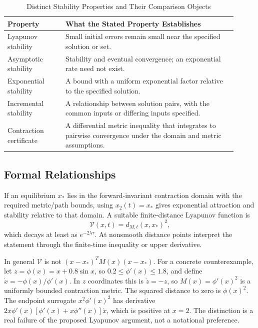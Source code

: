 \begin{table}[htbp]
\centering\small
\begin{tabular}{@{}p{0.23\linewidth}p{0.68\linewidth}@{}}
\toprule
Property & What the Stated Property Establishes\\
\midrule
Lyapunov stability & Small initial errors remain small near the specified solution or set.\\
Asymptotic stability & Stability and eventual convergence; an exponential rate need not exist.\\
Exponential stability & A bound with a uniform exponential factor relative to the specified solution.\\
Incremental stability & A relationship between solution pairs, with the common inputs or differing inputs specified.\\
Contraction certificate & A differential metric inequality that integrates to pairwise convergence under the domain and metric assumptions.\\
\bottomrule
\end{tabular}
\caption{Distinct Stability Properties and Their Comparison Objects}
\label{tbl:ch4:lyapunov-contraction}
\end{table}

\subsection{Formal Relationships}

\begin{proposition}
\label{prop:ch4:contraction-lyapunov}
If an equilibrium $x_*$ lies in the forward-invariant contraction domain with the required metric/path bounds, using $x_2(t)=x_*$ gives exponential attraction and stability relative to that domain. A suitable finite-distance Lyapunov function is
\begin{equation}
\mathcal V(x,t)=d_{M,t}(x,x_*)^2,
\label{eq:ch4:induced-lyapunov}
\end{equation}
which decays at least as $e^{-2\lambda\tau}$. At nonsmooth distance points interpret the statement through the finite-time inequality or upper derivative.
\end{proposition}

In general $\mathcal V$ is not $(x-x_*)^TM(x)(x-x_*)$. For a concrete counterexample, let $z=\phi(x)=x+0.8\sin x$, so $0.2\leq\phi'(x)\leq1.8$, and define $\dot x=-\phi(x)/\phi'(x)$. In $z$ coordinates this is $\dot z=-z$, so $M(x)=\phi'(x)^2$ is a uniformly bounded contraction metric. The squared distance to zero is $\phi(x)^2$. The endpoint surrogate $x^2\phi'(x)^2$ has derivative
$2x\phi'(x)[\phi'(x)+x\phi''(x)]\dot x$, which is positive at $x=2$. The distinction is a real failure of the proposed Lyapunov argument, not a notational preference.

